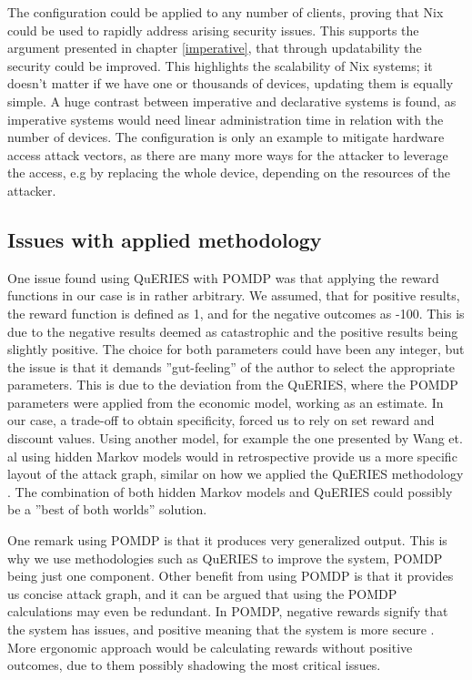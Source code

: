 The configuration could be applied to any number of clients, proving
that Nix could be used to rapidly address arising security
issues. This supports the argument presented in chapter
\ref{imperative}, that through updatability the security could be
improved. This highlights the scalability of Nix systems; it doesn't
matter if we have one or thousands of devices, updating them is
equally simple. A huge contrast between imperative and declarative
systems is found, as imperative systems would need linear
administration time in relation with the number of devices. The
configuration is only an example to mitigate hardware access attack
vectors, as there are many more ways for the attacker to leverage the
access, e.g by replacing the whole device, depending on the resources
of the attacker.

\subsection{Issues with applied methodology} \label{issues}

One issue found using QuERIES with POMDP was that applying the reward
functions in our case is in rather arbitrary. We assumed, that for
positive results, the reward function is defined as 1, and for the
negative outcomes as -100. This is due to the negative results deemed
as catastrophic and the positive results being slightly positive. The
choice for both parameters could have been any integer, but the issue
is that it demands ''gut-feeling'' of the author to select the
appropriate parameters. This is due to the deviation from the QuERIES,
where the POMDP parameters were applied from the economic model,
working as an estimate. In our case, a trade-off to obtain
specificity, forced us to rely on set reward and discount
values. Using another model, for example the one presented by Wang
et. al using hidden Markov models would in retrospective provide us a
more specific layout of the attack graph, similar on how we applied
the QuERIES methodology \cite{wang2010framework}. The
combination of both hidden Markov models and QuERIES could possibly be a ''best
of both worlds'' solution.

One remark using POMDP is that it produces very generalized
output. This is why we use methodologies such as QuERIES to improve
the system, POMDP being just one component. Other benefit from using
POMDP is that it provides us concise attack graph, and it can be argued that
using the POMDP calculations may even be redundant. In POMDP, negative
rewards signify that the system has issues, and positive meaning that
the system is more secure \cite{mcabeeMarkov}. More ergonomic approach
would be calculating rewards without positive outcomes, due to them
possibly shadowing the most critical issues.

